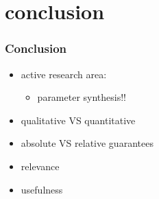\documentclass[handout]{beamer}
\begin{document}
\section{conclusion}
\begin{frame}
\frametitle{Conclusion}
\begin{itemize}
\item active research area:
\begin{itemize}
\item parameter synthesis!!
\end{itemize}
\item qualitative VS quantitative
\item absolute VS relative guarantees
\item relevance
\item usefulness
\end{itemize}
\end{frame}
\end{document}
